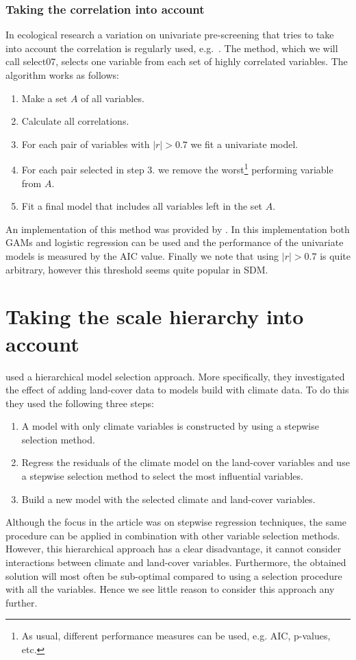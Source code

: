 \subsubsection{Taking the correlation into account}
In ecological research a variation on univariate pre-screening that tries to take into account the correlation is regularly used, e.g.\ \cite{cord_remote_2014}. The method, which we will call select07, selects one variable from each set of highly correlated variables. The algorithm works as follows:
\begin{enumerate}
\item Make a set $A$ of all variables.
\item Calculate all correlations.
\item For each pair of variables with $|r| > 0.7$ we fit a univariate model.
\item For each pair selected in step 3. we remove the worst\footnote{As usual, different performance measures can be used, e.g. AIC, p-values, etc.} performing variable from $A$.
\item Fit a final model that includes all variables left in the set $A$.
\end{enumerate}
An implementation of this method was provided by \cite{dormann_collinearity:_2013}. In this implementation both GAMs and logistic regression can be used and the performance of the univariate models is measured by the AIC value. Finally we note that using $|r| > 0.7$ is quite arbitrary, however this threshold seems quite popular in SDM.

\section{Taking the scale hierarchy into account}
\label{sec:TakingTheScaleHierarchyIntoAccount}
\cite{thuiller_we_2004} used a hierarchical model selection approach. More specifically, they investigated the effect of adding land-cover data to models build with climate data. To do this they used the following three steps:
\begin{enumerate}
\item A model with only climate variables is constructed by using a stepwise selection method.
\item Regress the residuals of the climate model on the land-cover variables and use a stepwise selection method to select the most influential variables.
\item Build a new model with the selected climate and land-cover variables.
\end{enumerate}
Although the focus in the article was on stepwise regression techniques, the same procedure can be applied in combination with other variable selection methods. However, this hierarchical approach has a clear disadvantage, it cannot consider interactions between climate and land-cover variables. Furthermore, the obtained solution will most often be sub-optimal compared to using a selection procedure with all the variables. Hence we see little reason to consider this approach any further.


